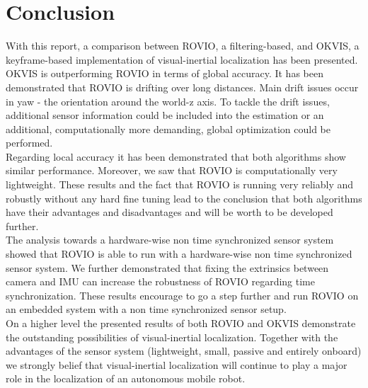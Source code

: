 \chapter{Conclusion}
\label{sec:conclusion}

With this report, a comparison between ROVIO, a filtering-based, and OKVIS, a keyframe-based implementation of visual-inertial localization has been presented. OKVIS is outperforming ROVIO in terms of global accuracy. It has been demonstrated that ROVIO is drifting over long distances. Main drift issues occur in yaw - the orientation around the world-z axis. To tackle the drift issues, additional sensor information could be included into the estimation or an additional, computationally more demanding, global optimization could be performed. \\

Regarding local accuracy it has been demonstrated that both algorithms show similar performance. Moreover, we saw that ROVIO is computationally very lightweight. These results and the fact that ROVIO is running very reliably and robustly without any hard fine tuning lead to the conclusion that both algorithms have their advantages and disadvantages and will be worth to be developed further. \\

The analysis towards a hardware-wise non time synchronized sensor system showed that ROVIO is able to run with a hardware-wise non time synchronized sensor system. We further demonstrated that fixing the extrinsics between camera and IMU can increase the robustness of ROVIO regarding time synchronization. These results encourage to go a step further and run ROVIO on an embedded system with a non time synchronized sensor setup. \\

On a higher level the presented results of both ROVIO and OKVIS demonstrate the outstanding possibilities of visual-inertial localization. Together with the advantages of the sensor system (lightweight, small, passive and entirely onboard) we strongly belief that visual-inertial localization will continue to play a major role in the localization of an autonomous mobile robot.

